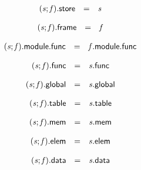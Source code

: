 $$
\begin{array}{@{}lcl@{}l@{}}
({\mathit{s}} ; {\mathit{f}}).\mathsf{store} &=& {\mathit{s}} &  \\
\end{array}
$$

$$
\begin{array}{@{}lcl@{}l@{}}
({\mathit{s}} ; {\mathit{f}}).\mathsf{frame} &=& {\mathit{f}} &  \\
\end{array}
$$

\vspace{1ex}

$$
\begin{array}{@{}lcl@{}l@{}}
({\mathit{s}} ; {\mathit{f}}).\mathsf{module}.\mathsf{func} &=& {\mathit{f}}.\mathsf{module}.\mathsf{func} &  \\
\end{array}
$$

$$
\begin{array}{@{}lcl@{}l@{}}
({\mathit{s}} ; {\mathit{f}}).\mathsf{func} &=& {\mathit{s}}.\mathsf{func} &  \\
\end{array}
$$

$$
\begin{array}{@{}lcl@{}l@{}}
({\mathit{s}} ; {\mathit{f}}).\mathsf{global} &=& {\mathit{s}}.\mathsf{global} &  \\
\end{array}
$$

$$
\begin{array}{@{}lcl@{}l@{}}
({\mathit{s}} ; {\mathit{f}}).\mathsf{table} &=& {\mathit{s}}.\mathsf{table} &  \\
\end{array}
$$

$$
\begin{array}{@{}lcl@{}l@{}}
({\mathit{s}} ; {\mathit{f}}).\mathsf{mem} &=& {\mathit{s}}.\mathsf{mem} &  \\
\end{array}
$$

$$
\begin{array}{@{}lcl@{}l@{}}
({\mathit{s}} ; {\mathit{f}}).\mathsf{elem} &=& {\mathit{s}}.\mathsf{elem} &  \\
\end{array}
$$

$$
\begin{array}{@{}lcl@{}l@{}}
({\mathit{s}} ; {\mathit{f}}).\mathsf{data} &=& {\mathit{s}}.\mathsf{data} &  \\
\end{array}
$$

